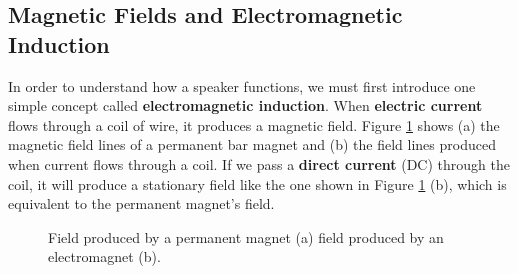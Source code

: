 \documentclass[11pt]{article}
\begin{document}
\subsection*{Magnetic Fields and Electromagnetic Induction}
In order to understand how a speaker functions, we must first introduce one simple concept called {\bf electromagnetic induction}. When {\bf electric current} flows through a coil of wire, it produces a magnetic field. Figure \ref{fig:field} shows (a) the magnetic field lines of a permanent bar magnet and (b) the field lines produced when current flows through a coil. If we pass a {\bf direct current} (DC) through the coil, it will produce a stationary field like the one shown in Figure \ref{fig:field} (b), which is equivalent to the permanent magnet's field. 
 
\begin{figure}[htb]\center
{}
\caption{Field produced by a permanent magnet (a) field produced by an electromagnet (b). \label{fig:field}}
\end{figure}
\end{document}
